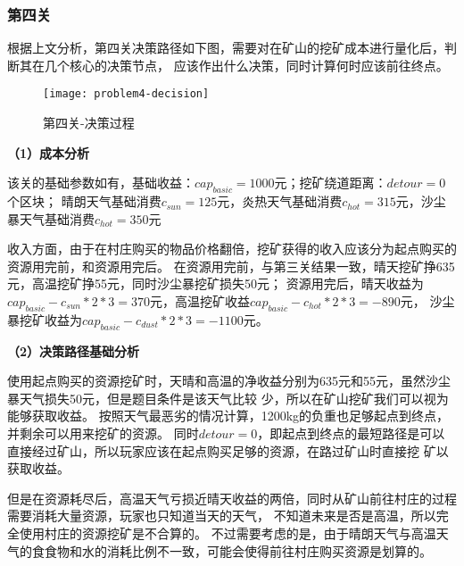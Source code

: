 \documentclass[bwprint]{cumcmthesis} %
\begin{document}
\subsubsection{第四关}

根据上文分析，第四关决策路径如下图，需要对在矿山的挖矿成本进行量化后，判断其在几个核心的决策节点，
应该作出什么决策，同时计算何时应该前往终点。

\begin{figure}[!h]
    \centering
    \texttt{[image: problem4-decision]}
    \caption{第四关-决策过程}
    \label{fig:problem4-decision}
\end{figure}

\textbf{（1）成本分析}

该关的基础参数如有，基础收益：$cap_{basic} = 1000$元；挖矿绕道距离：$detour = 0$个区块；
晴朗天气基础消费$c_{sun}=125$元，炎热天气基础消费$c_{hot}=315$元，沙尘暴天气基础消费$c_{hot}=350$元

收入方面，由于在村庄购买的物品价格翻倍，挖矿获得的收入应该分为起点购买的资源用完前，和资源用完后。
在资源用完前，与第三关结果一致，晴天挖矿挣635元，高温挖矿挣55元，同时沙尘暴挖矿损失50元；
资源用完后，晴天收益为$cap_{basic}-c_{sun}*2*3=370$元，高温挖矿收益$cap_{basic}-c_{hot}*2*3=-890$元，
沙尘暴挖矿收益为$cap_{basic}-c_{dust}*2*3=-1100$元。

\textbf{（2）决策路径基础分析}


使用起点购买的资源挖矿时，天晴和高温的净收益分别为635元和55元，虽然沙尘暴天气损失50元，但是题目条件是该天气比较
少，所以在矿山挖矿我们可以视为能够获取收益。
按照天气最恶劣的情况计算，1200kg的负重也足够起点到终点，并剩余可以用来挖矿的资源。
同时$detour=0$，即起点到终点的最短路径是可以直接经过矿山，所以玩家应该在起点购买足够的资源，在路过矿山时直接挖
矿以获取收益。

但是在资源耗尽后，高温天气亏损近晴天收益的两倍，同时从矿山前往村庄的过程需要消耗大量资源，玩家也只知道当天的天气，
不知道未来是否是高温，所以完全使用村庄的资源挖矿是不合算的。
不过需要考虑的是，由于晴朗天气与高温天气的食食物和水的消耗比例不一致，可能会使得前往村庄购买资源是划算的。

\end{document}

